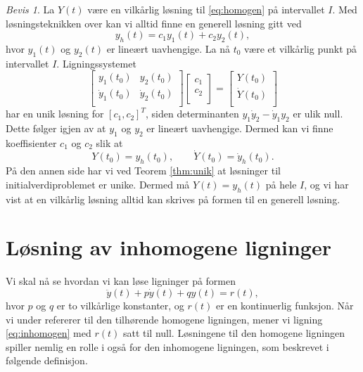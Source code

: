 \documentclass{article}
\theoremstyle{definition}
\theoremstyle{remark}
\newtheorem*{bevis}{Bevis}
\begin{document}
\begin{multicols*}{2}
\begin{bevis}
  La $Y(t)$ være en vilkårlig løsning til \eqref{eq:homogen} på intervallet $I$. Med løsningsteknikken over kan vi alltid finne en generell løsning gitt ved
  \begin{equation*}
    y_h(t) = c_1 y_1(t) + c_2 y_2(t),
  \end{equation*}
  hvor $y_1(t)$ og $y_2(t)$ er lineært uavhengige. La nå $t_0$ være et vilkårlig punkt på intervallet $I$. Ligningssystemet
  \begin{equation*}
    \begin{bmatrix}
      y_1(t_0) & y_2(t_0) \\
      \dot{y}_1(t_0) & \dot{y}_2(t_0) \\
    \end{bmatrix}
    \begin{bmatrix}
      c_1 \\
      c_2 \\
    \end{bmatrix}
    =
    \begin{bmatrix}
      Y(t_0) \\
      \dot{Y}(t_0) \\
    \end{bmatrix}
  \end{equation*}
  har en unik løsning for $[c_1, c_2]^T$, siden determinanten $y_1 \dot{y}_2 - \dot{y}_1 y_2$ er ulik null. Dette følger igjen av at $y_1$ og $y_2$ er lineært uavhengige. Dermed kan vi finne koeffisienter $c_1$ og $c_2$ slik at 
  \begin{equation*}
    Y(t_0) = y_h(t_0), \qquad \dot{Y}(t_0) = \dot{y}_h(t_0).
  \end{equation*}
  På den annen side har vi ved Teorem \ref{thm:unik} at løsninger til initialverdiproblemet er unike. Dermed må $Y(t) = y_h(t)$ på hele $I$, og vi har vist at en vilkårlig løsning alltid kan skrives på formen til en generell løsning.
\end{bevis}


\section*{Løsning av inhomogene ligninger}
Vi skal nå se hvordan vi kan løse ligninger på formen
\begin{equation} \label{eq:inhomogen}
    \ddot{y}(t) + p \dot{y}(t) + q y(t) = r(t),
\end{equation}
hvor $p$ og $q$ er to vilkårlige konstanter, og $r(t)$ er en kontinuerlig funksjon. Når vi under refererer til den tilhørende homogene ligningen, mener vi ligning \eqref{eq:inhomogen} med $r(t)$ satt til null. Løsningene til den homogene ligningen spiller nemlig en rolle i også for den inhomogene ligningen, som beskrevet i følgende definisjon.


\end{multicols*}
\end{document}
